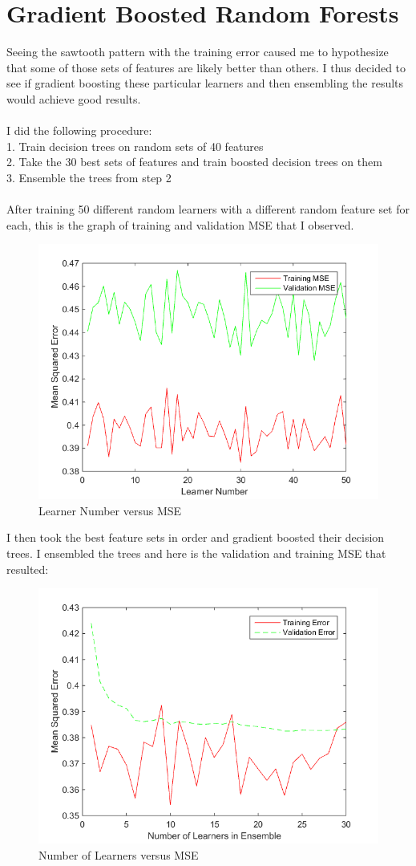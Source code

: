 \documentclass[twoside,11pt]{article}
\theoremstyle{definition}
\begin{document}
\section*{Gradient Boosted Random Forests}

Seeing the sawtooth pattern with the training error caused me to hypothesize that some of those sets of features are likely better than others. I thus decided to see if gradient boosting these particular learners and then ensembling the results would achieve good results. \\
\\
I did the following procedure:\\
1. Train decision trees on random sets of 40 features\\
2. Take the 30 best sets of features and train boosted decision trees on them\\
3. Ensemble the trees from step 2\\
\\
After training 50 different random learners with a different random feature set for each, this is the graph of training and validation MSE that I observed.
\begin{figure}[h!]
\centering
\includegraphics[width=4 in]{learnerNumVersusMSE.png}
\caption{Learner Number versus MSE}
\end{figure}

I then took the best feature sets in order and gradient boosted their decision trees. I ensembled the trees and here is the validation and training MSE that resulted:

\begin{figure}[h!]
\centering
\includegraphics[width=4 in]{numLearnersVersusMSE2.png}
\caption{Number of Learners versus MSE}
\end{figure}
\end{document}
